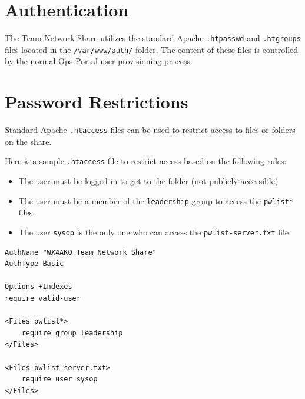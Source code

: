 \documentclass[pdflatex,letterpaper,twoside,12pt]{book}
\begin{document}

\section{Authentication}

The Team Network Share utilizes the standard Apache \texttt{.htpasswd} and \texttt{.htgroups} files located in the \texttt{/var/www/auth/} folder.  The content of these files is controlled by the normal Ops Portal user provisioning process.


\section{Password Restrictions}

Standard Apache \texttt{.htaccess} files can be used to restrict access to files or folders on the share.

Here is a sample \texttt{.htaccess} file to restrict access based on the following rules:

\begin{itemize}
\item The user must be logged in to get to the folder (not publicly accessible)
\item The user must be a member of the \texttt{leadership} group to access the \texttt{pwlist*} files.
\item The user \texttt{sysop} is the only one who can access the \texttt{pwlist-server.txt} file.
\end{itemize}

\begin{lstlisting}
AuthName "WX4AKQ Team Network Share"
AuthType Basic

Options +Indexes
require valid-user

<Files pwlist*>
	require group leadership
</Files>

<Files pwlist-server.txt>
	require user sysop
</Files>
\end{lstlisting}

\end{document}
